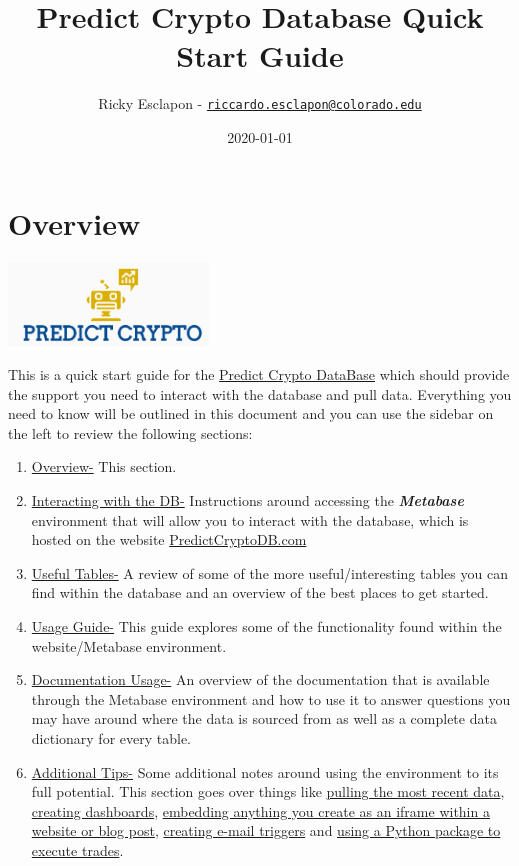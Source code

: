 \documentclass[]{book}
\title{Predict Crypto Database Quick Start Guide}
\author{Ricky Esclapon - \href{mailto:riccardo.esclapon@colorado.edu}{\nolinkurl{riccardo.esclapon@colorado.edu}}}
\date{2020-01-01}
\begin{document}
\maketitle

{
\setcounter{tocdepth}{1}
\tableofcontents
}
\hypertarget{overview}{%
\chapter{Overview}\label{overview}}

\href{https://predictcryptodb.com}{\includegraphics{images/PredictCryptoLogo.PNG}}

This is a quick start guide for the \href{https://predictcryptodb.com}{Predict Crypto DataBase} which should provide the support you need to interact with the database and pull data. Everything you need to know will be outlined in this document and you can use the sidebar on the left to review the following sections:

\begin{enumerate}
\def\labelenumi{\arabic{enumi}.}
\item
  \protect\hyperlink{overview}{Overview-} This section.
\item
  \protect\hyperlink{interacting-with-the-db}{Interacting with the DB-} Instructions around accessing the \textbf{\emph{Metabase}} environment that will allow you to interact with the database, which is hosted on the website \href{https://predictcryptodb.com}{PredictCryptoDB.com}
\item
  \protect\hyperlink{useful-tables}{Useful Tables-} A review of some of the more useful/interesting tables you can find within the database and an overview of the best places to get started.
\item
  \protect\hyperlink{usage-guide}{Usage Guide-} This guide explores some of the functionality found within the website/Metabase environment.
\item
  \protect\hyperlink{documentation-usage}{Documentation Usage-} An overview of the documentation that is available through the Metabase environment and how to use it to answer questions you may have around where the data is sourced from as well as a complete data dictionary for every table.
\item
  \protect\hyperlink{additional-tips}{Additional Tips-} Some additional notes around using the environment to its full potential. This section goes over things like \protect\hyperlink{pulling-most-recent-data}{pulling the most recent data}, \protect\hyperlink{creating-dashboards}{creating dashboards}, \protect\hyperlink{embedding-anything-created-on-metabase}{embedding anything you create as an iframe within a website or blog post}, \protect\hyperlink{creating-e-mail-triggers}{creating e-mail triggers} and \protect\hyperlink{using-the-shrimpy-python-library}{using a Python package to execute trades}.
\end{enumerate}
\end{document}
